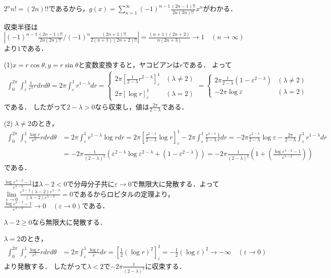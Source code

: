 \documentclass[
		book,
		head_space=20mm,
		foot_space=20mm,
		gutter=10mm,
		line_length=190mm
]{jlreq}
\begin{document}
$2^n n!=(2n)!!$であるから，$g(x)=\sum\limits_{n=1}^\infty(-1)^{n-1} \frac{(2n-1)!!}{2n(2n)!!}x^{n}$がわかる．

収束半径は$|(-1)^{n-1} \frac{(2n-1)!!}{2n(2n)!!}/(-1)^{n} \frac{(2n+1)!!}{2(n+1)(2n+2)!!}|=\frac{(n+1)(2n+2)}{n(2n+3)}\rightarrow 1\quad(n\to \infty)$より$1$である．

(1)$x=r\cos \theta,y=r\sin \theta$と変数変換すると，ヤコビアンは$r$である．
よって \begin{align}
    \int_0^{2\pi}\int_\varepsilon^1\frac{1}{r^\lambda}rdrd\theta=2\pi\int_\varepsilon^1r^{1-\lambda}dr=\begin{cases}
    2\pi [\frac{1}{2-\lambda}r^{2-\lambda}]_\varepsilon^1 & (\lambda\neq 2)\\
    2\pi [\log r]_\varepsilon^1 &(\lambda=2)
    \end{cases}=\begin{cases}
        2\pi \frac{1}{2-\lambda}(1-\varepsilon^{2-\lambda}) & (\lambda\neq 2)\\
        -2\pi \log \varepsilon &(\lambda=2)
        \end{cases}
\end{align}である．
したがって$2-\lambda>0$なら収束し，値は$\frac{2\pi}{2-\lambda}$である．

(2) $\lambda\neq 2$のとき，
\begin{align}
    \int_0^{2\pi}\int_\varepsilon^1\frac{\log r}{r^\lambda}rdrd\theta&=2\pi\int_\varepsilon^1r^{1-\lambda}\log rdr=2\pi [\frac{r^{2-\lambda}}{2-\lambda}\log r]_{\varepsilon}^1-2\pi\int_{\varepsilon}^1 \frac{r^{2-\lambda}}{2-\lambda}\frac{1}{r}dr=-2\pi\frac{\varepsilon^{2-\lambda}}{2-\lambda}\log \varepsilon-\frac{2\pi}{2-\lambda}\int_\varepsilon^1 r^{1-\lambda}dr\\
    &=-2\pi \frac{1}{(2-\lambda)^2}(\varepsilon^{2-\lambda}\log \varepsilon^{2-\lambda}+(1-\varepsilon^{2-\lambda}))=-2\pi\frac{1}{(2-\lambda)^2}(1+(\frac{\log \varepsilon^{\lambda-2}-1}{\varepsilon^{\lambda-2}}))
\end{align}である．

$\frac{\log \varepsilon^{\lambda-2}-1}{\varepsilon^{\lambda-2}}$は$\lambda-2<0$で分母分子共に$\varepsilon\to 0$で無限大に発散する．よって$\lim\limits_{\varepsilon\to 0}\frac{\varepsilon^{2-\lambda}(\lambda-2)\varepsilon^{\lambda-3}}{(\lambda-2)\varepsilon^{\lambda-3}}=0$であるからロピタルの定理より，$\frac{\log \varepsilon^{\lambda-2}-1}{\varepsilon^{\lambda-2}}\to 0\quad(\varepsilon\to 0)$である．

$\lambda-2\ge 0$なら無限大に発散する．

$\lambda=2$のとき，
\begin{align}
    \int_0^{2\pi}\int_\varepsilon^1\frac{\log r}{r^2}rdrd\theta&=2\pi\int_\varepsilon^1 \frac{\log r}{r}dr=\left[ \frac{1}{2}(\log r)^2 \right]_{\varepsilon}^1=-\frac{1}{2}(\log \varepsilon)^2\rightarrow -\infty \quad(\varepsilon\to 0)
\end{align}
より発散する．
したがって$\lambda<2$で$-2\pi\frac{1}{(2-\lambda)^2}$に収束する．
\end{document}

